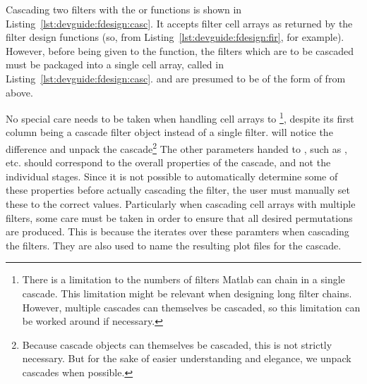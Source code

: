 Cascading two filters with the  or  functions
is  shown in  Listing~\ref{lst:devguide:fdesign:casc}. It accepts  filter cell
arrays  as  returned  by  the  filter design  functions  (so,    from
\mbox{Listing~\ref{lst:devguide:fdesign:fir}},  for example). However,  before
being  given to  the   function, the  filters which  are to  be
cascaded must  be packaged into a  single cell array, called   in
\mbox{Listing~\ref{lst:devguide:fdesign:casc}}.   and  are
presumed to be of the form of  from above.

No special care  needs to be taken when handling   cell arrays to
\footnote{%
    There is  a limitation  to the numbers  of filters Matlab  can chain  in a
    single  cascade. This limitation  might  be relevant  when designing  long
    filter chains. However,  multiple cascades can themselves  be cascaded, so
    this limitation can be worked around if necessary.
},
despite  its first  column  being  a cascade  filter  object
instead of  a single  filter.  will  notice the  difference and
unpack the cascade\footnote{
    Because cascade objects  can themselves be cascaded, this  is not strictly
    necessary.   But for  the sake  of easier  understanding and  elegance, we
    unpack cascades when possible.%
}
The other parameters  handed to , such  as , 
etc. should correspond  to the overall properties of the  cascade, and not the
individual stages. Since it is not possible to automatically determine some of
these properties before actually cascading  the filter, the user must manually
set these to the correct  values. Particularly when cascading cell arrays with
multiple filters, some care must be taken  in order to ensure that all desired
permutations are  produced. This is because the   iterates over
these paramters  when cascading the  filters. They are  also used to  name the
resulting plot files for the cascade.


